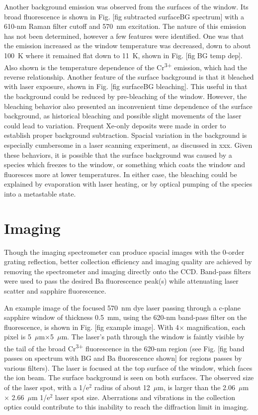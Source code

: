 Another background emission was observed from the surfaces of the window.  Its broad fluorescence is shown in Fig. [fig subtracted surfaceBG spectrum] with a 610-nm Raman filter cutoff and {\color{red}570~nm} excitation.  The nature of this emission has not been determined, however a few features were identified.  One was that the emission increased as the window temperature was decreased, down to about 100~K where it remained flat down to 11~K, shown in Fig. [fig BG temp dep].  Also shown is the temperature dependence of the Cr\textsuperscript{3+} emission, which had the reverse relationship.  Another feature of the surface background is that it bleached with laser exposure, shown in Fig. [fig surfaceBG bleaching].  This useful in that the background could be reduced by pre-bleaching of the window.  However, the bleaching behavior also presented an inconvenient time dependence of the surface background, as historical bleaching and possible slight movements of the laser could lead to variation.  Frequent Xe-only deposits were made in order to establish proper background subtraction.  Spacial variation in the background is especially cumbersome in a laser scanning experiment, as discussed in xxx.  Given these behaviors, it is possible that the surface background was caused by a species which freezes to the window, or something which coats the window and fluoresces more at lower temperatures.  In either case, the bleaching could be explained by evaporation with laser heating, or by optical pumping of the species into a metastable state.

\section{Imaging}
\label{imaging}

Though the imaging spectrometer can produce spacial images with the 0-order grating reflection, better collection efficiency and imaging quality are achieved by removing the spectrometer and imaging directly onto the CCD.  Band-pass filters were used to pass the desired Ba fluorescence peak(s) while attenuating laser scatter and sapphire fluorescence.

An example image of the focused 570~nm dye laser passing through a c-plane sapphire window of thickness 0.5~mm, using the 620-nm band-pass filter on the fluorescence, is shown in Fig. [fig example image].  With 4$\times$ magnification, each pixel is 5~$\mu$m$\times$5~$\mu$m.  The laser's path through the window is faintly visible by the tail of the broad Cr\textsuperscript{3+} fluorescence in the 620-nm region (see Fig. [fig band passes on spectrum with BG and Ba fluorescence shown] for regions passes by various filters).  The laser is focused at the top surface of the window, which faces the ion beam.  The surface background is seen on both surfaces.  The observed size of the laser spot, with a 1/e$^{2}$ radius of about 12~$\mu$m, is larger than the 2.06~$\mu$m $\times$ 2.66~$\mu$m 1/e$^{2}$ laser spot size.  Aberrations and vibrations in the collection optics could contribute to this inability to reach the diffraction limit in imaging.

